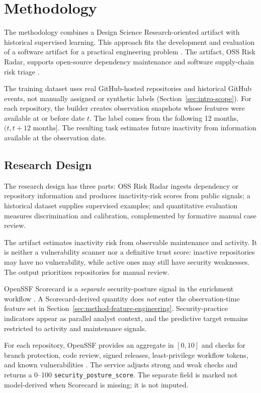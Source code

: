 \chapter{Methodology}
\label{chap:methodology}

The methodology combines a Design Science Research-oriented artifact with
historical supervised learning. This approach fits the development and
evaluation of a software artifact for a practical engineering problem
\cite{hevner2004design,peffers2007design}. The artifact, OSS Risk Radar, supports
open-source dependency maintenance and software supply-chain risk triage
\cite{ossRiskRadarReadme}.

The training dataset uses real GitHub-hosted repositories and historical GitHub
events, not manually assigned or synthetic labels
(Section~\ref{sec:intro-scope}). For each repository, the builder creates
observation snapshots whose features were available at or before date \(t\).
The label comes from the following 12 months,
\((t, t + 12\text{ months}]\). The resulting task estimates future inactivity
from information available at the observation date.

\section{Research Design}
\label{sec:method-research-design}

The research design has three parts: OSS Risk Radar ingests dependency or
repository information and produces inactivity-risk scores from public signals;
a historical dataset supplies supervised examples; and quantitative evaluation
measures discrimination and calibration, complemented by formative manual case
review.

The artifact estimates inactivity risk from observable maintenance and activity.
It is neither a vulnerability scanner nor a definitive trust score: inactive
repositories may have no vulnerability, while active ones may still have
security weaknesses. The output prioritizes repositories for manual review.

OpenSSF Scorecard is a \emph{separate} security-posture signal in the enrichment
workflow \cite{zahan2023scorecard}. A Scorecard-derived quantity does \emph{not}
enter the observation-time feature set in
Section~\ref{sec:method-feature-engineering}.
Security-practice indicators appear as parallel analyst context, and the
predictive target remains restricted to activity and maintenance signals.

For each repository, OpenSSF provides an aggregate in \([0,10]\) and checks for
branch protection, code review, signed releases, least-privilege workflow tokens,
and known vulnerabilities \cite{zahan2023scorecard}. The service adjusts strong
and weak checks and returns a 0--100 \texttt{security\_posture\_score}. The
separate field is marked not model-derived when Scorecard is missing; it is not
imputed.

